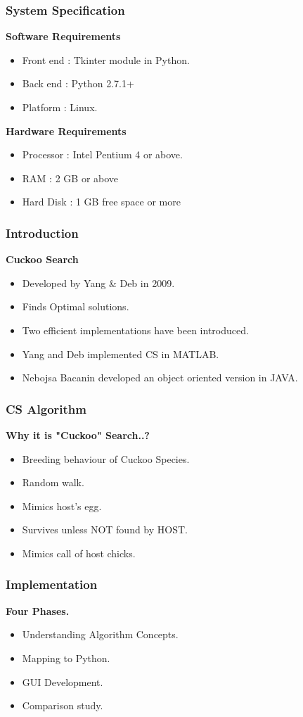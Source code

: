\documentclass[10pt]{beamer}
\begin{document}
\begin{frame}
  \frametitle{System Specification}
  \textbf{Software Requirements}
  \begin{itemize}
  	\item Front end : Tkinter module in Python.
    \item Back end   : Python 2.7.1+
    \item Platform    : Linux.
  \end{itemize}
  \textbf{Hardware Requirements}
  \begin{itemize}
  	\item Processor : Intel Pentium 4 or above.
  	\item RAM	       : 2 GB or above
  	\item Hard Disk : 1 GB free space or more
  \end{itemize}	
\end{frame}


\begin{frame}
  \frametitle{Introduction}
  \textbf{Cuckoo Search}
  \medskip
  \begin{itemize}
  	\pause
  	\item Developed by Yang & Deb in 2009.
  	\pause
  	\item Finds Optimal solutions.
  	\pause
  	\item Two efficient implementations have been introduced.
  	\pause
    \item Yang and Deb implemented CS in MATLAB.
    \pause
    \item Nebojsa Bacanin developed an object oriented version in JAVA.
  \end{itemize}
\end{frame}

\begin{frame}
  \frametitle{CS Algorithm}
  \textbf{Why it is "Cuckoo" Search..?}
  \begin{itemize}
  	\pause
  	\item Breeding behaviour of Cuckoo Species.
  	\pause
    \item Random walk.
    \pause
    \item Mimics host's egg.
    \pause
    \item Survives unless NOT found by HOST.
    \pause
    \item Mimics call of host chicks.
  \end{itemize}
\end{frame}

\begin{frame}
  \frametitle{Implementation}
  \textbf{Four Phases.}
	 \begin{itemize}
	 	\pause
    	\item Understanding Algorithm Concepts.
    	\pause
	    \item Mapping to Python. 
	    \pause
        \item GUI Development.
        \pause
        \item Comparison study.
     \end{itemize}
\end{frame}
\end{document}

